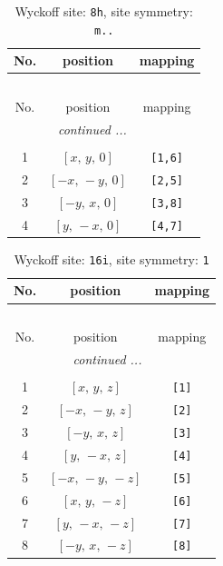 \documentclass[fleqn,8pt]{jsarticle}
\begin{document}
\renewcommand{\arraystretch}{1.2}
\begin{longtable}{ccc}
\caption{Wyckoff site: {\tt 8h}, site symmetry: {\tt m..}}
 \\
 \hline \hline
No. & position & mapping \\ \hline \endfirsthead

\multicolumn{2}{l}{\tablename\ \thetable{}} \\
 \hline \hline
No. & position & mapping \\ \hline \endhead

 \hline \hline
\multicolumn{2}{r}{\footnotesize\it continued ...} \\ \endfoot

 \hline \hline
\multicolumn{2}{r}{} \\ \endlastfoot

1 & $\left[ x,\, y,\, 0 \right]$ & {\tt [1,6]} \\ \hline
2 & $\left[ - x,\, - y,\, 0 \right]$ & {\tt [2,5]} \\ \hline
3 & $\left[ - y,\, x,\, 0 \right]$ & {\tt [3,8]} \\ \hline
4 & $\left[ y,\, - x,\, 0 \right]$ & {\tt [4,7]} \\
\end{longtable}
\renewcommand{\arraystretch}{1.2}
\begin{longtable}{ccc}
\caption{Wyckoff site: {\tt 16i}, site symmetry: {\tt 1}}
 \\
 \hline \hline
No. & position & mapping \\ \hline \endfirsthead

\multicolumn{2}{l}{\tablename\ \thetable{}} \\
 \hline \hline
No. & position & mapping \\ \hline \endhead

 \hline \hline
\multicolumn{2}{r}{\footnotesize\it continued ...} \\ \endfoot

 \hline \hline
\multicolumn{2}{r}{} \\ \endlastfoot

1 & $\left[ x,\, y,\, z \right]$ & {\tt [1]} \\ \hline
2 & $\left[ - x,\, - y,\, z \right]$ & {\tt [2]} \\ \hline
3 & $\left[ - y,\, x,\, z \right]$ & {\tt [3]} \\ \hline
4 & $\left[ y,\, - x,\, z \right]$ & {\tt [4]} \\ \hline
5 & $\left[ - x,\, - y,\, - z \right]$ & {\tt [5]} \\ \hline
6 & $\left[ x,\, y,\, - z \right]$ & {\tt [6]} \\ \hline
7 & $\left[ y,\, - x,\, - z \right]$ & {\tt [7]} \\ \hline
8 & $\left[ - y,\, x,\, - z \right]$ & {\tt [8]} \\
\end{longtable}
\end{document}

